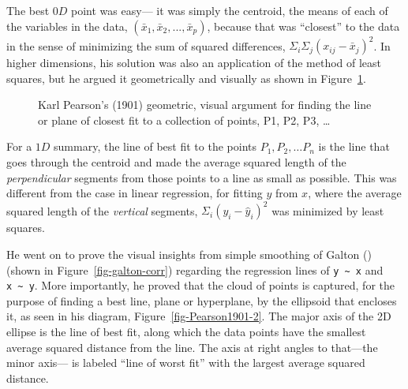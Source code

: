 \documentclass[
  letterpaper,
  10pt,
  krantz2]{krantz}
\begin{document}
{The best \(0D\) point was easy--- it was simply the centroid, the means
of each of the variables in the data,
\((\bar{x}_1, \bar{x}_2, ..., \bar{x}_p)\), because that was ``closest''
to the data in the sense of minimizing the sum of squared differences,
\(\Sigma_i\Sigma_j (x_{ij} - \bar{x}_j)^2\). In higher dimensions, his
solution was also an application of the method of least squares, but he
argued it geometrically and visually as shown in
Figure~\ref{fig-Pearson1901}.

\begin{figure}


\caption{\label{fig-Pearson1901}Karl Pearson's (1901) geometric, visual
argument for finding the line or plane of closest fit to a collection of
points, P1, P2, P3, \ldots{}}

\end{figure}%

For a \(1D\) summary, the line of best fit to the points
\(P_1, P_2, \dots P_n\) is the line that goes through the centroid and
made the average squared length of the \emph{perpendicular} segments
from those points to a line as small as possible. This was different
from the case in linear regression, for fitting \(y\) from \(x\), where
the average squared length of the \emph{vertical} segments,
\(\Sigma_i (y_i - \hat{y}_i)^2\) was minimized by least squares.

He went on to prove the visual insights from simple smoothing of Galton
() (shown in
Figure~\ref{fig-galton-corr}) regarding the regression lines of
\texttt{y\ \textasciitilde{}\ x} and \texttt{x\ \textasciitilde{}\ y}.
More importantly, he proved that the cloud of points is captured, for
the purpose of finding a best line, plane or hyperplane, by the
ellipsoid that encloses it, as seen in his diagram,
Figure~\ref{fig-Pearson1901-2}. The major axis of the 2D ellipse is the
line of best fit, along which the data points have the smallest average
squared distance from the line. The axis at right angles to that---the
minor axis--- is labeled ``line of worst fit'' with the largest average
squared distance.

}
\end{document}

